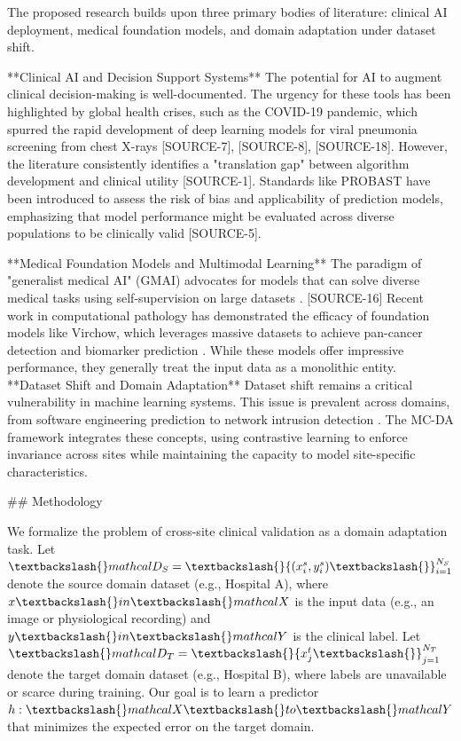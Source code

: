 \documentclass{article}
\begin{document}
The proposed research builds upon three primary bodies of literature: clinical AI deployment, medical foundation models, and domain adaptation under dataset shift.

**Clinical AI and Decision Support Systems**
The potential for AI to augment clinical decision-making is well-documented.  The urgency for these tools has been highlighted by global health crises, such as the COVID-19 pandemic, which spurred the rapid development of deep learning models for viral pneumonia screening from chest X-rays [SOURCE-7], [SOURCE-8], [SOURCE-18]. However, the literature consistently identifies a "translation gap" between algorithm development and clinical utility [SOURCE-1]. Standards like PROBAST have been introduced to assess the risk of bias and applicability of prediction models, emphasizing that model performance might be evaluated across diverse populations to be clinically valid [SOURCE-5].

**Medical Foundation Models and Multimodal Learning** The paradigm of "generalist medical AI" (GMAI) advocates for models that can solve diverse medical tasks using self-supervision on large datasets . [SOURCE-16] Recent work in computational pathology has demonstrated the efficacy of foundation models like Virchow, which leverages massive datasets to achieve pan-cancer detection and biomarker prediction .  While these models offer impressive performance, they generally treat the input data as a monolithic entity. **Dataset Shift and Domain Adaptation**
Dataset shift remains a critical vulnerability in machine learning systems.  This issue is prevalent across domains, from software engineering prediction to network intrusion detection .  The MC-DA framework integrates these concepts, using contrastive learning to enforce invariance across sites while maintaining the capacity to model site-specific characteristics.

\#\# Methodology

We formalize the problem of cross-site clinical validation as a domain adaptation task. Let $\textbackslash{}mathcal{D}_S = \textbackslash{}{(x_i^s, y_i^s)\textbackslash{}}_{i=1}^{N_S}$ denote the source domain dataset (e.g., Hospital A), where $x \textbackslash{}in \textbackslash{}mathcal{X}$ is the input data (e.g., an image or physiological recording) and $y \textbackslash{}in \textbackslash{}mathcal{Y}$ is the clinical label. Let $\textbackslash{}mathcal{D}_T = \textbackslash{}{x_j^t\textbackslash{}}_{j=1}^{N_T}$ denote the target domain dataset (e.g., Hospital B), where labels are unavailable or scarce during training. Our goal is to learn a predictor $h: \textbackslash{}mathcal{X} \textbackslash{}to \textbackslash{}mathcal{Y}$ that minimizes the expected error on the target domain.
\end{document}
